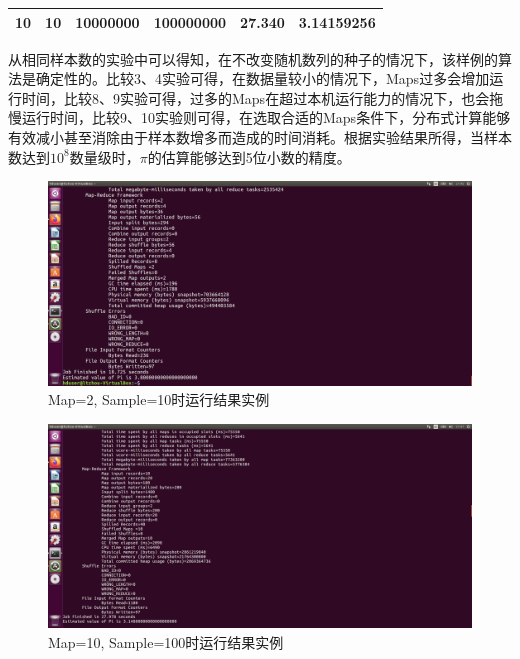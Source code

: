 \documentclass{article}
\begin{document}
\begin{table}[htbp]
\begin{tabular}{cccccc}
10                  & 10                                                                & 10000000                                                             & 100000000                                                              & 27.340                                                             & 3.14159256                                                      \\ \hline
\end{tabular}
\end{table}

从相同样本数的实验中可以得知，在不改变随机数列的种子的情况下，该样例的算法是确定性的。比较3、4实验可得，在数据量较小的情况下，Maps过多会增加运行时间，比较8、9实验可得，过多的Maps在超过本机运行能力的情况下，也会拖慢运行时间，比较9、10实验则可得，在选取合适的Maps条件下，分布式计算能够有效减小甚至消除由于样本数增多而造成的时间消耗。根据实验结果所得，当样本数达到$10^8$数量级时，$\pi$的估算能够达到5位小数的精度。


\begin{figure}[htbp]
\centering
\includegraphics[width=13.5cm]{img/2-10.png}
\caption{Map=2, Sample=10时运行结果实例}
\label{fig:2-10}
\end{figure}

\begin{figure}[htbp]
\centering
\includegraphics[width=13.5cm]{img/10-100.png}
\caption{Map=10, Sample=100时运行结果实例}
\label{fig:2-10}
\end{figure}
\end{document}
